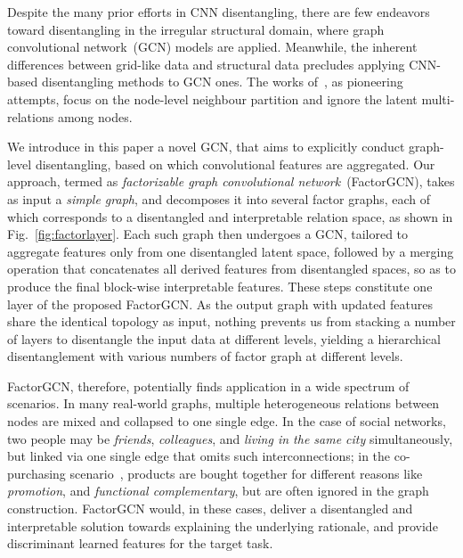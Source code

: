 \documentclass{article}
\begin{document}
Despite the many prior efforts in CNN disentangling,
there are few endeavors 
toward disentangling in the irregular structural domain, 
where graph convolutional network~(GCN) models are applied. 
Meanwhile, the inherent differences between grid-like data and structural data precludes applying CNN-based disentangling methods to GCN ones.
The works of~\citep{ma2019disentangled,liu2019independence}, 
as pioneering attempts, 
focus on the node-level 
neighbour partition
and ignore the latent multi-relations among nodes.

We introduce in this paper a novel GCN, that aims to explicitly conduct graph-level disentangling, based on which convolutional features are aggregated. Our approach, termed as \emph{factorizable graph convolutional network}~(FactorGCN), 
takes as input a \emph{simple graph}, 
and decomposes it into several 
factor graphs, each of which corresponds  
to a disentangled and interpretable relation space, 
as shown in Fig.~\ref{fig:factorlayer}.
Each such graph then undergoes a GCN, tailored to
aggregate features only from one disentangled latent space,
followed by a merging operation that concatenates all derived 
features from disentangled spaces,
so as to produce the final block-wise interpretable features. 
These steps constitute one layer of the proposed FactorGCN.
As the output graph with updated features share the identical
topology as input, nothing prevents us 
from stacking a number of
layers to disentangle the input data at different levels,
yielding a hierarchical disentanglement 
with various numbers of factor 
graph at different levels.


FactorGCN, therefore, 
potentially finds application in a 
wide spectrum of scenarios. 
In many real-world graphs, 
multiple heterogeneous relations 
between nodes are mixed and 
collapsed to one single edge.
In the case of social networks,
two people may be \emph{friends}, \emph{colleagues},
and \emph{living in the same city} simultaneously,
but linked via one single edge that omits such
interconnections;
in the co-purchasing scenario~\citep{co-purchase},
products are bought together for
different reasons like \emph{promotion}, 
and \emph{functional complementary},
but are often ignored in the graph construction.
FactorGCN would, in these cases,
deliver a disentangled and interpretable 
solution towards explaining the underlying 
rationale, and provide discriminant learned features
for the target task.

\iffalse
multiple relations may exist between two person,
like friend, colleague, neighbor, and family.
However, these relations may mixed up when constructing the graph
by only considering whether them are connected.  
Another example is the co-purchase graph~\citep{co-purchase}, 
where products can be purchased together with
different reasons, like promotion, advertisement,
and functional complementary.
These reasons cannot be detected when constructing
the graph by consider whether they are bought 
together frequently.
\fi
\end{document}
